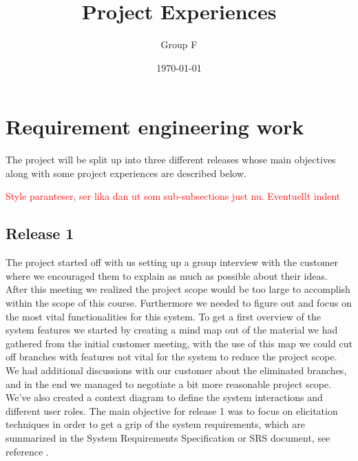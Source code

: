 \documentclass[10pt]{article}
\newcommand\todo[1]{\textcolor{red}{#1}}
\begin{document}
\makeatletter
\renewcommand{\@biblabel}[1]{\quad#1.}
\makeatother


\pagestyle{myheadings}





\begin{titlepage}
\title{Project Experiences}
\author{Group F}
\date{\today}
\maketitle
\thispagestyle{empty}
\end{titlepage}

\tableofcontents
\thispagestyle{empty}
\newpage
{}

\section{Requirement engineering work}
\noindent The project will be split up into three different releases whose main objectives along with some project experiences are described below.

\todo{Style paranteser, ser lika dan ut som sub-subsections just nu. Eventuellt indent}

\subsection{Release 1}
The project started off with us setting up a group interview with the customer where we encouraged them to explain as much as possible about their ideas. After this meeting we realized the project scope would be too large to accomplish within the scope of this course. Furthermore we needed to figure out and focus on the most vital functionalities for this system.
To get a first overview of the system features we started by creating a mind map out of the material we had gathered from the initial customer meeting, with the use of this map we could cut off branches with features not vital for the system to reduce the project scope.
We had additional discussions with our customer about the eliminated branches, and in the end we managed to negotiate a bit more reasonable project scope.
\newline We've also created a context diagram to define the system interactions and different user roles.
The main objective for release 1 was to focus on elicitation techniques in order to get a grip of the system requirements, which are summarized in the System Requirements Specification or SRS document, see reference \cite{srs}.
\end{document}

